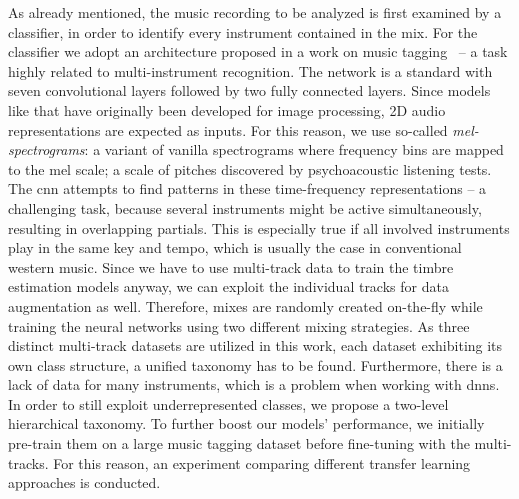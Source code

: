 As already mentioned, the music recording to be analyzed is first examined by a classifier, in order to identify every instrument contained in the mix. For the classifier we adopt an architecture proposed in a work on music tagging~\cite{won2020evaluation} -- a task highly related to multi-instrument recognition. The network is a standard  with seven convolutional layers followed by two fully connected layers. Since models like that have originally been developed for image processing, 2D audio representations are expected as inputs. For this reason, we use so-called \textit{mel-spectrograms}: a variant of vanilla spectrograms where frequency bins are mapped to the mel scale; a scale of pitches discovered by psychoacoustic listening tests. The \gls{cnn} attempts to find patterns in these time-frequency representations -- a challenging task, because several instruments might be active simultaneously, resulting in overlapping partials. This is especially true if all involved instruments play in the same key and tempo, which is usually the case in conventional western music. Since we have to use multi-track data to train the timbre estimation models anyway, we can exploit the individual tracks for data augmentation as well. Therefore, mixes are randomly created on-the-fly while training the neural networks using two different mixing strategies. As three distinct multi-track datasets are utilized in this work, each dataset exhibiting its own class structure, a unified taxonomy has to be found. Furthermore, there is a lack of data for many instruments, which is a problem when working with \glspl{dnn}. In order to still exploit underrepresented classes, we propose a two-level hierarchical taxonomy. To further boost our models' performance, we initially pre-train them on a large music tagging dataset before fine-tuning with the multi-tracks. For this reason, an experiment comparing different transfer learning approaches is conducted.\\

